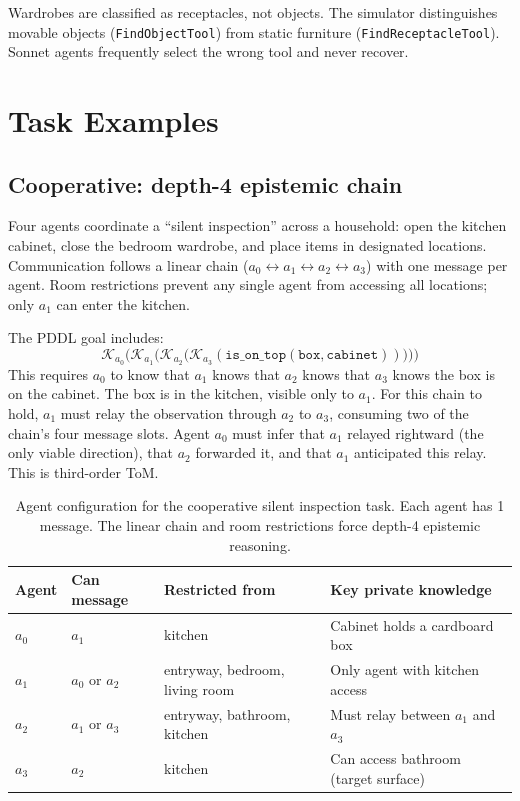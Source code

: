 \documentclass{article} %
\newcommand{\K}{\mathcal{K}}
\begin{document}
Wardrobes are classified as receptacles, not objects. The simulator distinguishes movable objects (\texttt{FindObjectTool}) from static furniture (\texttt{FindReceptacleTool}). Sonnet agents frequently select the wrong tool and never recover.


\section{Task Examples}
\label{app:examples}

\subsection{Cooperative: depth-4 epistemic chain}
\label{app:example_coop}

Four agents coordinate a ``silent inspection'' across a household: open the kitchen cabinet, close the bedroom wardrobe, and place items in designated locations. Communication follows a linear chain ($a_0 \leftrightarrow a_1 \leftrightarrow a_2 \leftrightarrow a_3$) with one message per agent. Room restrictions prevent any single agent from accessing all locations; only $a_1$ can enter the kitchen.

The PDDL goal includes:
%
\begin{equation}
  \K_{a_0}\bigl(\K_{a_1}\bigl(\K_{a_2}\bigl(\K_{a_3}(\texttt{is\_on\_top}(\texttt{box}, \texttt{cabinet}))\bigr)\bigr)\bigr)
  \label{eq:example_k4}
\end{equation}
%
This requires $a_0$ to know that $a_1$ knows that $a_2$ knows that $a_3$ knows the box is on the cabinet. The box is in the kitchen, visible only to $a_1$. For this chain to hold, $a_1$ must relay the observation through $a_2$ to $a_3$, consuming two of the chain's four message slots. Agent $a_0$ must infer that $a_1$ relayed rightward (the only viable direction), that $a_2$ forwarded it, and that $a_1$ anticipated this relay. This is third-order ToM.

\begin{table}[h]
\begin{center}
\small
\begin{tabular}{lllp{4.2cm}}
\toprule
\textbf{Agent} & \textbf{Can message} & \textbf{Restricted from} & \textbf{Key private knowledge} \\
\midrule
$a_0$ & $a_1$ & kitchen & Cabinet holds a cardboard box \\
$a_1$ & $a_0$ or $a_2$ & entryway, bedroom, living room & Only agent with kitchen access \\
$a_2$ & $a_1$ or $a_3$ & entryway, bathroom, kitchen & Must relay between $a_1$ and $a_3$ \\
$a_3$ & $a_2$ & kitchen & Can access bathroom (target surface) \\
\bottomrule
\end{tabular}
\end{center}
\caption{Agent configuration for the cooperative silent inspection task. Each agent has 1 message. The linear chain and room restrictions force depth-4 epistemic reasoning.}
\label{tab:example_agents}
\end{table}
\end{document}
